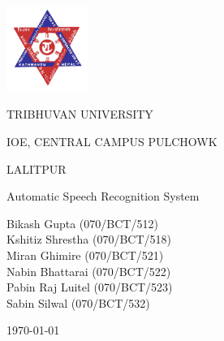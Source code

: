 \documentclass[a4paper,12pt,onepage]{article}
\begin{document}
\begin{titlepage}
  \centering
  \includegraphics[width=0.2\textwidth]{tu_logo.png}\par%
  {\textsc\LARGE TRIBHUVAN UNIVERSITY \par}
  {\textsc\LARGE IOE, CENTRAL CAMPUS PULCHOWK \par}
  {\textsc\LARGE LALITPUR \par}
  \vspace{1cm}
	{\LARGE\textsc Automatic Speech Recognition System\par}
	\vspace{3cm}
        {
          {\Large Bikash Gupta (070/BCT/512)}\\
          \vspace{0.1cm}
          {\Large Kshitiz Shrestha (070/BCT/518)}\\
          \vspace{0.1cm}
          {\Large Miran Ghimire (070/BCT/521)}\\
          \vspace{0.1cm}
          {\Large Nabin Bhattarai (070/BCT/522)}\\
          \vspace{0.1cm}
          {\Large Pabin Raj Luitel (070/BCT/523)}\\
          \vspace{0.1cm}
          {\Large Sabin Silwal (070/BCT/532)}\\
          \vspace{0.1cm}
        }
	\vspace{1cm}

	\vfill

	{\large \today\par}
\end{titlepage}
\setcounter{page}{2}
\end{document}
